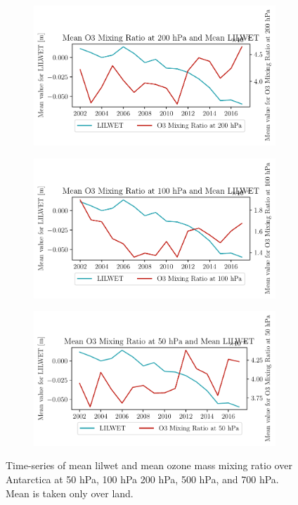 \documentclass[../main.tex]{subfiles}
\begin{document}
\begin{figure}[hbt!]
\begin{subfigure}[b]{0.45\textwidth}
    \end{subfigure}
    \begin{subfigure}[b]{0.45\textwidth}
    \includegraphics[width=\textwidth]{images/2021w5/chapter7/hres/tiemseries_o3_200_LIC}
    \end{subfigure}
    \begin{subfigure}[b]{0.45\textwidth}
    \includegraphics[width=\textwidth]{images/2021w5/chapter7/hres/tiemseries_o3_100_LIC}
    \end{subfigure}
    \begin{subfigure}[b]{0.45\textwidth}
    \includegraphics[width=\textwidth]{images/2021w5/chapter7/hres/tiemseries_o3_50_LIC}
    \end{subfigure}
    \caption{Time-series of mean \gls{lilwet} and mean ozone mass mixing ratio over Antarctica at 50 hPa, 100 hPa 200 hPa, 500 hPa, and 700 hPa. Mean is taken only over land.}
    \label{fig:timeseries_o3_50}
\end{figure}
\end{document}

